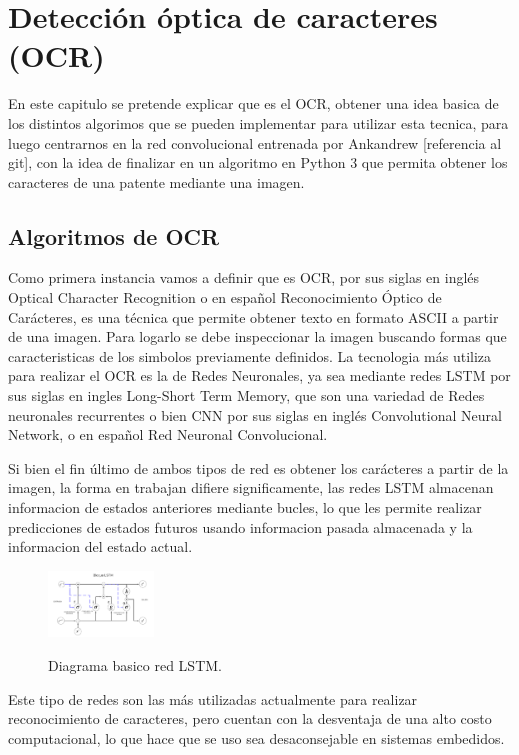 \chapter{Detección óptica de caracteres (OCR)}
En este capitulo se pretende explicar que es el OCR, obtener una idea basica
de los distintos algorimos que se pueden implementar para
utilizar esta tecnica, para luego centrarnos en la red convolucional entrenada por
Ankandrew [referencia al git], con la idea de finalizar en un algoritmo en Python 3
que permita obtener los caracteres de una patente mediante una imagen.

\section{Algoritmos de OCR}
Como primera instancia vamos a definir que es OCR, por sus siglas en inglés Optical Character
Recognition o en español Reconocimiento Óptico de Carácteres, es una técnica que permite
obtener texto en formato ASCII a partir de una imagen.
Para logarlo se debe inspeccionar la imagen buscando formas que caracteristicas de los simbolos previamente definidos.
La tecnologia más utiliza para realizar el OCR es la de Redes Neuronales, ya sea
mediante redes LSTM por sus siglas en ingles Long-Short Term Memory, que son una variedad de Redes
neuronales recurrentes o bien CNN por sus siglas en inglés Convolutional Neural Network, o en español Red
Neuronal Convolucional.

Si bien el fin último de ambos tipos de red es obtener los carácteres a partir de la imagen, la forma en
trabajan difiere significamente, las redes LSTM almacenan informacion de estados anteriores mediante bucles,
lo que les permite realizar predicciones de estados futuros usando informacion pasada almacenada y la informacion
del estado actual.
\begin{figure}[h]
    \centering
    \includegraphics[width=0.25\textwidth]{imgs/diagrama-lstm.png}
    \label{fig:diagrama-LSTM}
    \caption{Diagrama basico red LSTM.}
\end{figure}

Este tipo de redes son las más utilizadas actualmente para realizar reconocimiento de caracteres, pero cuentan con la desventaja de una alto costo computacional, lo que hace que se uso sea desaconsejable en sistemas embedidos.

